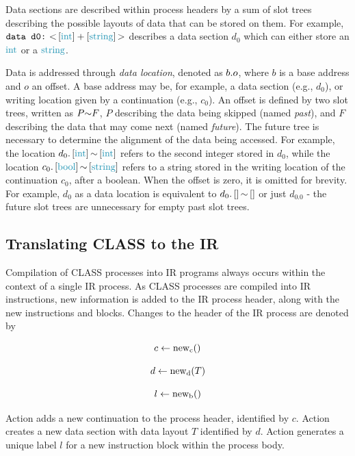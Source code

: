 \documentclass[sigconf,nonacm,natbib=true]{acmart}
\begin{document}
Data sections are described within process headers by a sum of slot trees describing the possible layouts of data that can be stored on them. For example, $\texttt{data d0:}\ \combst{\seqst{\ints} + \seqst{\strings}}$ describes a data section $d_0$ which can either store an $\ints$ or a $\strings$.

Data is addressed through \textit{data location}, denoted as $b.o$, where $b$ is a base address and $o$ an offset. A base address may be, for example, a data section (e.g., $d_0$), or  writing   location given by a continuation (e.g., $c_0$). An offset is defined by two slot trees, written as $P\text{$\sim$}F$, $P$ describing the data being skipped (named \textit{past}), and $F$ describing the data that may come next (named \textit{future}). The future tree is necessary to determine the alignment of the data being accessed. For example, the location $\datal{d_0}{\seqst{\ints}}{\seqst{\ints}}$ refers to the second integer stored in $d_0$, while the location $\datal{c_0}{\seqst{\bools}}{\seqst{\strings}}$ refers to a string stored in the writing location of the continuation $c_0$, after a boolean. When the offset is zero, it is omitted for brevity. For example, $d_0$ as a data location is equivalent to $d_0.\left[\right]\text{$\sim$}\left[\right]$ or just $d_0.0$ - the future slot trees are unnecessary for empty past slot trees.

\subsection{Translating CLASS to the IR}

Compilation of \ac{CLASS} processes into \ac{IR} programs always occurs within the context of a single \ac{IR} process. As \ac{CLASS} processes are compiled into \ac{IR} instructions, new information is added to the \ac{IR} process header, along with the new instructions and blocks. Changes to the header of the \ac{IR} process are denoted by
\begin{center}
\setlength{\abovedisplayskip}{-4pt}
\begin{minipage}{0.3\linewidth}\begin{equation}c \leftarrow \text{new}_{\text{c}}()\label{eq:makecont}\end{equation}\end{minipage}
\hfill
\begin{minipage}{0.3\linewidth}\begin{equation}d \leftarrow \text{new}_{\text{d}}(T)\label{eq:makedata}\end{equation}\end{minipage}
\hfill
\begin{minipage}{0.3\linewidth}\begin{equation}l \leftarrow \text{new}_{\text{b}}()\label{eq:makeblock}\end{equation}\end{minipage}
\end{center}
Action  adds a new continuation to the process header, identified by $c$. Action  creates a new data section with data layout $T$ identified by $d$. Action  generates a unique label $l$ for a new instruction block within the process body.
\end{document}
